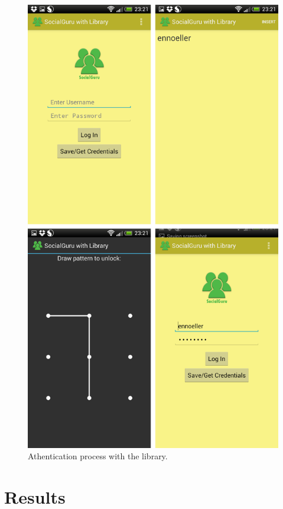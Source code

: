 \begin{figure}[H]
\begin{center}
\includegraphics[scale=0.3]{images/auth.png}
\caption{Athentication process with the library.}
\label{fig:authentication}
\end{center}
\end{figure}

\section{Results}

